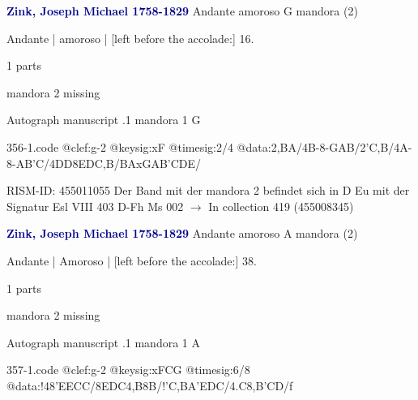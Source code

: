 \documentclass[twocolumn]{book}
\begin{document}
\newline \par \vspace{7pt} \textcolor{darkblue}{\textbf{Zink, Joseph Michael  1758-1829}}
\newline Andante amoroso  G  
\newline mandora (2)
\newline \begin{itshape}[f.12r, at left:] Andante | amoroso | [left before the accolade:] 16.\end{itshape} 
\newline \textcolor{darkblue}{}  1 parts  
\newline \begin{small} mandora 2 missing\end{small} 
\newline Autograph manuscript
.1  mandora 1  G  
\begin{filecontents*}{356-1.code}
@clef:g-2
@keysig:xF
@timesig:2/4
@data:2,BA/4B-8-GAB/2'C,B/4A-8-A{B'C}/4DD8EDC,B/BAxGA{B'C}DE/
\end{filecontents*}
\newline
%

\newline RISM-ID: 455011055
\newline Der Band mit der mandora 2 befindet sich in D Eu mit der Signatur Esl VIII 403
\newline D-Fh  Ms 002
\newline $\rightarrow$ In collection 419 (455008345)

\newline \par \vspace{7pt} \textcolor{darkblue}{\textbf{Zink, Joseph Michael  1758-1829}}
\newline Andante amoroso  A  
\newline mandora (2)
\newline \begin{itshape}[f.22v, at left:] Andante | Amoroso | [left before the accolade:] 38.\end{itshape} 
\newline \textcolor{darkblue}{}  1 parts  
\newline \begin{small} mandora 2 missing\end{small} 
\newline Autograph manuscript
.1  mandora 1  A  
\begin{filecontents*}{357-1.code}
@clef:g-2
@keysig:xFCG
@timesig:6/8
@data:!48'EECC/8EDC4,B8B/!{'C,B}A'EDC/4.C8,B'CD/f
\end{filecontents*}
\newline
%
\end{document}
